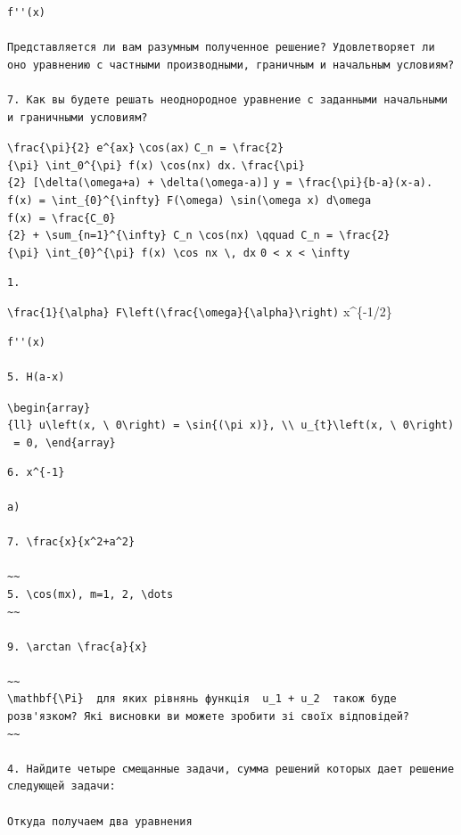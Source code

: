\documentclass[
  ukrainian,
]{article}
\begin{document}
\begin{verbatim}
f''(x)

Представляется ли вам разумным полученное решение? Удовлетворяет ли оно уравнению с частными производными, граничным и начальным условиям?

7. Как вы будете решать неоднородное уравнение с заданными начальными и граничными условиям?
\end{verbatim}

\texttt{\textbackslash{}frac\{\textbackslash{}pi\}\{2\}\ e\^{}\{ax\}}
\texttt{\textbackslash{}cos(ax)}
\texttt{C\_n\ =\ \textbackslash{}frac\{2\}\{\textbackslash{}pi\}\ \textbackslash{}int\_0\^{}\{\textbackslash{}pi\}\ f(x)\ \textbackslash{}cos(nx)\ dx.}
\texttt{\textbackslash{}frac\{\textbackslash{}pi\}\{2\}\ {[}\textbackslash{}delta(\textbackslash{}omega+a)\ +\ \textbackslash{}delta(\textbackslash{}omega-a){]}}
\texttt{y\ =\ \textbackslash{}frac\{\textbackslash{}pi\}\{b-a\}(x-a).}
\texttt{f(x)\ =\ \textbackslash{}int\_\{0\}\^{}\{\textbackslash{}infty\}\ F(\textbackslash{}omega)\ \textbackslash{}sin(\textbackslash{}omega\ x)\ d\textbackslash{}omega}
\texttt{f(x)\ =\ \textbackslash{}frac\{C\_0\}\{2\}\ +\ \textbackslash{}sum\_\{n=1\}\^{}\{\textbackslash{}infty\}\ C\_n\ \textbackslash{}cos(nx)\ \textbackslash{}qquad\ C\_n\ =\ \textbackslash{}frac\{2\}\{\textbackslash{}pi\}\ \textbackslash{}int\_\{0\}\^{}\{\textbackslash{}pi\}\ f(x)\ \textbackslash{}cos\ nx\ \textbackslash{},\ dx}
\texttt{0\ \textless{}\ x\ \textless{}\ \textbackslash{}infty}

\begin{verbatim}
1.
\end{verbatim}

\texttt{\textbackslash{}frac\{1\}\{\textbackslash{}alpha\}\ F\textbackslash{}left(\textbackslash{}frac\{\textbackslash{}omega\}\{\textbackslash{}alpha\}\textbackslash{}right)}
x\^{}\{-1/2\}

\begin{verbatim}
f''(x)

5. H(a-x)
\end{verbatim}

\texttt{\textbackslash{}begin\{array\}\{ll\}\ u\textbackslash{}left(x,\ \textbackslash{}\ 0\textbackslash{}right)\ =\ \textbackslash{}sin\{(\textbackslash{}pi\ x)\},\ \textbackslash{}\textbackslash{}\ u\_\{t\}\textbackslash{}left(x,\ \textbackslash{}\ 0\textbackslash{}right)\ =\ 0,\ \textbackslash{}end\{array\}}

\begin{verbatim}
6. x^{-1}

a)

7. \frac{x}{x^2+a^2}

~~
5. \cos(mx), m=1, 2, \dots
~~

9. \arctan \frac{a}{x}

~~
\mathbf{\Pi}  для яких рівнянь функція  u_1 + u_2  також буде розв'язком? Які висновки ви можете зробити зі своїх відповідей?
~~

4. Найдите четыре смещанные задачи, сумма решений которых дает решение следующей задачи:

Откуда получаем два уравнения
\end{verbatim}
\end{document}
